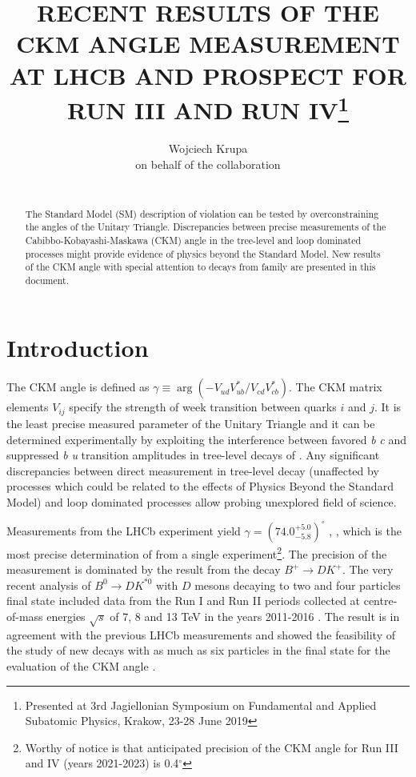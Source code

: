 \documentclass{appolb}
\begin{document}
\title{RECENT RESULTS OF THE CKM ANGLE \g MEASUREMENT AT LHCB AND PROSPECT FOR RUN III AND RUN IV\footnote{Presented at 3rd Jagiellonian Symposium on Fundamental and Applied Subatomic Physics, Krakow, 23-28 June 2019} }
\author{Wojciech Krupa \\ on behalf of the \lhcb collaboration 
\address{AGH University of Science and Technology \\Faculty of Physics and Applied Computer Science \\ al. Mickiewicza 30, 30-059 Krakow, Poland}
\\
}
\maketitle
\begin{abstract}
The Standard Model (SM) description of \CP violation can be tested by overconstraining the angles of the Unitary Triangle. Discrepancies between precise measurements of the Cabibbo-Kobayashi-Maskawa (CKM) angle \g in the tree-level and loop dominated processes might provide evidence of physics beyond the Standard Model. New results of the CKM angle \g with special attention to decays from  family are presented in this document.

\end{abstract}

\section{Introduction}
The CKM angle \g is defined as $\gamma \equiv \arg(-V_{ud}V_{ub}^{*}/V_{cd}V_{cb}^{*})$.  The CKM matrix elements $V_{ij}$ specify the strength of week transition between quarks $i$ and $j$. It is the least precise measured parameter of the Unitary Triangle and it can be determined experimentally by exploiting the interference between favored \textit{b} \to \textit{c} and suppressed \textit{b} \to \textit{u} transition amplitudes in tree-level decays of . Any significant discrepancies between direct measurement in tree-level decay (unaffected by processes which could be related to the effects of Physics Beyond the Standard Model) and loop dominated processes allow probing unexplored field of science.  

Measurements from the LHCb experiment yield $\gamma=(74.0^{+5.0}_{-5.8})^\circ$ \cite{gamma_B2DK}, \cite{gamma_comb}, which is the most precise determination of \g from a single experiment\footnote{Worthy of notice is that anticipated precision of the CKM angle \g for Run III and IV (years 2021-2023) is 0.4$^\circ$\cite{lhcb_phys_case}}. The precision of the measurement is dominated by the result from the decay $B^+\rightarrow D K^+$. The very recent analysis of $B^0\rightarrow D K^{*0}$ with $D$ mesons decaying to two and four particles final state included data from the Run I and Run II periods collected at centre-of-mass energies $\sqrt s$ of 7, 8 and 13 TeV in the years 2011-2016 \cite{B2Dkstar0}. The result is in agreement with the previous LHCb measurements and showed the feasibility of the study of new decays with as much as six particles in the final state for the evaluation of the CKM angle \g.  
\end{document}
